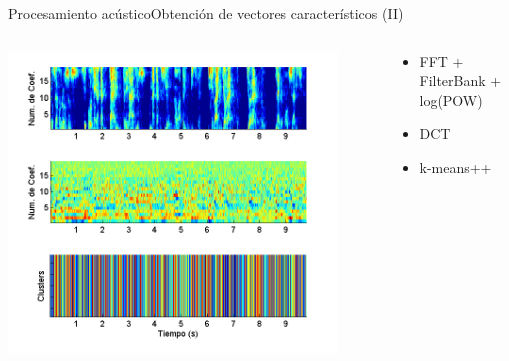 \begin{frame}{Procesamiento acústico}{Obtención de vectores característicos (II)}
  \small {
  \vspace{0mm} 
  \begin{columns}   
    \begin{column}{0.6\textwidth} 
      \hfill  
      \includegraphics[width=0.9\textwidth]{gfx/filename52}    
    \end{column}
    \begin{column}{0.4\textwidth}
      \vspace{-8mm} 
      \begin{itemize}
        \setlength{\itemindent}{-2em}      
        \itemsep 4.6em    
        \item FFT + FilterBank + log(POW)
        \item DCT
        \item k-means++
      \end{itemize}
    \end{column}   
  \end{columns}   
  }
\end{frame}